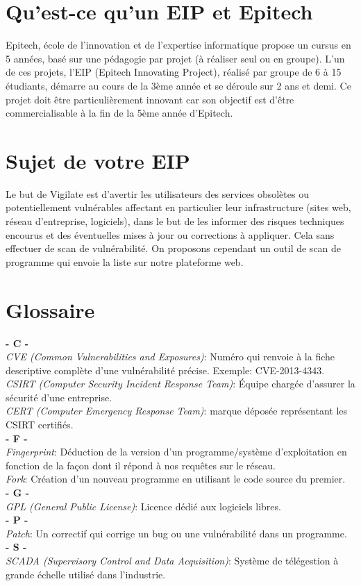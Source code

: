 \section{Qu'est-ce qu’un EIP et Epitech}
Epitech,  école de l'innovation et de l'expertise informatique propose un cursus en 5 années, basé sur une pédagogie par projet (à réaliser seul ou en groupe).  L'un de ces projets, l’EIP (Epitech Innovating Project), réalisé par groupe de 6 à 15 étudiants, démarre au cours de la 3ème année et se déroule sur 2 ans et demi. Ce  projet doit être particulièrement innovant car son objectif est d’être commercialisable à la fin de la 5ème année d’Epitech.

\section{Sujet de votre EIP}
Le but de Vigilate est d’avertir les utilisateurs des services obsolètes ou potentiellement vulnérables affectant en particulier leur infrastructure (sites web, réseau d'entreprise, logiciels), dans le but de les informer des risques techniques encourus et des éventuelles mises à jour ou corrections à appliquer.
Cela sans effectuer de scan de vulnérabilité.
On proposons cependant un outil de scan de programme qui envoie la liste sur notre plateforme web.

\section{Glossaire}
\noindent
\vskip 0.1cm
\textbf{- C -}\\
\vskip 0.1cm
\textit{CVE (Common Vulnerabilities and Exposures)}: Numéro qui renvoie à la fiche descriptive complète d'une vulnérabilité précise. Exemple: CVE-2013-4343.\\
\textit{CSIRT (Computer Security Incident Response Team)}: Équipe chargée d'assurer la sécurité d'une entreprise.\\
\textit{CERT (Computer Emergency Response Team)}: marque déposée représentant les CSIRT certifiés.\\
\vskip 0.1cm
\textbf{- F -}\\
\vskip 0.1cm
\textit{Fingerprint}: Déduction de la version d'un programme/système d'exploitation en fonction de la façon dont il répond à nos requêtes sur le réseau.\\
\textit{Fork}: Création d'un nouveau programme en utilisant le code source du premier.\\
\vskip 0.1cm
\textbf{- G -}\\
\vskip 0.1cm
\textit{GPL (General Public License)}: Licence dédié aux logiciels libres.\\
\vskip 0.1cm
\textbf{- P -}\\
\vskip 0.1cm
\textit{Patch}: Un correctif qui corrige un bug ou une vulnérabilité dans un programme.\\
\vskip 0.1cm
\textbf{- S -}\\
\vskip 0.1cm
\textit{SCADA (Supervisory Control and Data Acquisition)}: Système de télégestion à grande échelle utilisé dans l'industrie.\\

